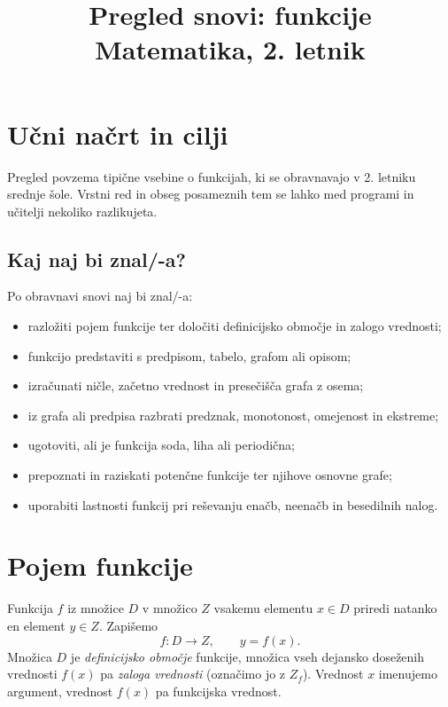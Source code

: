 \documentclass[a4paper,12pt]{article}
\title{\textcolor{bordotemno}{Pregled snovi: funkcije}\\\large\textcolor{bordosvetlo}{Matematika, 2. letnik}}
\author{}
\date{}
\begin{document}
\maketitle
\newpage
{\hypersetup{linkcolor=zelenasvetla}\color{zelenasvetla}\tableofcontents}
\hypersetup{linkcolor=blue}
\newpage

\section{Učni načrt in cilji}

Pregled povzema tipične vsebine o funkcijah, ki se obravnavajo v 2. letniku srednje šole. Vrstni red in obseg posameznih tem se lahko med programi in učitelji nekoliko razlikujeta.

\begin{vsebinskiokvir}
\subsection*{Kaj naj bi znal/-a?}
Po obravnavi snovi naj bi znal/-a:
\begin{itemize}
	\item razložiti pojem funkcije ter določiti definicijsko območje in zalogo vrednosti;
	\item funkcijo predstaviti s predpisom, tabelo, grafom ali opisom;
	\item izračunati ničle, začetno vrednost in presečišča grafa z osema;
	\item iz grafa ali predpisa razbrati predznak, monotonost, omejenost in ekstreme;
	\item ugotoviti, ali je funkcija soda, liha ali periodična;
	\item prepoznati in raziskati potenčne funkcije ter njihove osnovne grafe;
	\item uporabiti lastnosti funkcij pri reševanju enačb, neenačb in besedilnih nalog.
\end{itemize}
\end{vsebinskiokvir}

\clearpage
\section{Pojem funkcije}

\begin{vsebinskiokvir}
Funkcija $f$ iz množice $D$ v množico $Z$ vsakemu elementu $x\in D$ priredi natanko en element $y\in Z$. Zapišemo
\[
	f\colon D\to Z,\qquad y=f(x).
\]
Množica $D$ je \emph{definicijsko območje} funkcije, množica vseh dejansko doseženih vrednosti $f(x)$ pa \emph{zaloga vrednosti} (označimo jo z $Z_f$). Vrednost $x$ imenujemo argument, vrednost $f(x)$ pa funkcijska vrednost.
\end{vsebinskiokvir}
\end{document}
